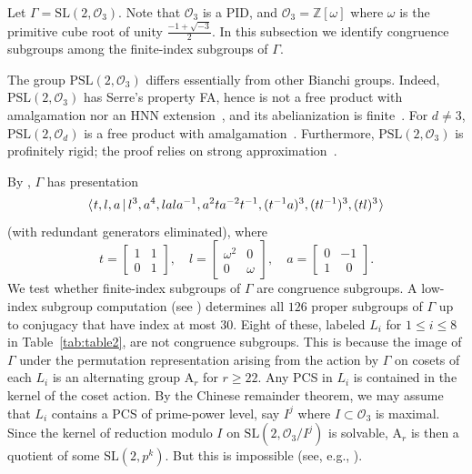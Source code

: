 \documentclass[11pt]{amsart}
\theoremstyle{definition}
\theoremstyle{remark}
\newcommand{\Z}{\mathbb{Z}}
\newcommand{\G}{{\Gamma}}
\newcommand{\SL}{\mathrm{SL}}
\newcommand{\PSL}{\mathrm{PSL}}
\begin{document}
Let $\G = \SL(2, \mathcal{O}_3)$. Note that $\mathcal{O}_3$ 
is a PID, and $\mathcal{O}_3 = \allowbreak \Z[\omega]$
 where $\omega$ is the primitive cube root
of unity $\frac{-1+\sqrt{-3}}{2}$. In this subsection we 
 identify congruence subgroups among the finite-index 
 subgroups of $\G$.

The group $\PSL(2, \mathcal{O}_3)$ differs essentially from 
other Bianchi groups. Indeed, $\PSL(2, \mathcal{O}_3)$
has Serre's property FA, hence is not a free product with 
amalgamation nor an HNN extension~\cite[Corollary 1]{Alperin}, 
and its abelianization is finite~\cite[p.~2939]{Alperin}.
For $d \neq 3$, $\PSL(2, \mathcal{O}_d)$ is a free product with 
amalgamation~\cite[Theorem~6.3.1, p.~162]{Fine}. Furthermore, 
$\PSL(2, \mathcal{O}_3)$ is profinitely rigid; the proof relies 
on strong approximation~\cite[Section 6.2]{ReidAnnMath}.

By \cite[Theorem~6.1]{Swan}, $\Gamma$ has presentation
\[
\langle \hspace{.75pt} t,l,a \, | \, l^3,a^4,
 lala^{-1},a^2ta^{-2}t^{-1},
(t^{-1}a)^3, (tl^{-1})^3, (tl)^3  \hspace{.75pt} \rangle
\]
(with redundant generators eliminated), where
\[
t=\begin{bmatrix}1&1\\0&1\end{bmatrix},\quad
l=\begin{bmatrix}\omega^2&0\\0&\omega
\end{bmatrix},\quad
a=\begin{bmatrix}0&-1\\1&\ \ 0\end{bmatrix}.
\]
\noindent 
We test whether finite-index subgroups of $\G$ are congruence 
 subgroups. A low-index subgroup computation (see 
\cite[Section~5.4]{Handbook}) determines all $126$ proper 
subgroups of $\G$ up to conjugacy that have index at most $30$. 
Eight of these, labeled $L_i$ for $1\leq i \leq 8$ in 
Table~\ref{tab:table2}, are not congruence subgroups. This is 
because the image of $\G$ under the permutation representation 
arising from the action by $\G$ on cosets of each $L_i$ is an 
alternating group $\mathrm{A}_r$ for $r \ge 22$. Any PCS in $L_i$ 
is contained in the kernel of the coset action. 
By the Chinese remainder theorem, we may assume 
that $L_i$ contains a PCS of prime-power level, say $I^j$ 
where $I\subset \mathcal{O}_3$ is maximal. Since the kernel
of reduction modulo $I$ on $\SL(2,\mathcal{O}_3/I^j)$ is 
solvable, $\mathrm{A}_r$ is then a quotient of some 
$\SL(2,p^k)$. But this is impossible (see, e.g., 
\cite[Proposition~10, p.\hspace{1.5pt}333]{LubotzkySegal}).
\end{document}

